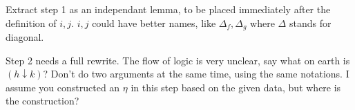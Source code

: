 Extract step 1 as an independant lemma, to be placed immediately after
the definition of $ i, j $.
$ i, j $ could have better names, like $ \Delta _{f}, \Delta _{g} $ where
$ \Delta $ stands for diagonal.

Step 2 needs a full rewrite. The flow of logic is very unclear, say
what on earth is $ (h \downarrow k) $?
Don't do two arguments at the same time, using the same notations.
I assume you constructed an $ \eta $ in this step based on the given data,
but where is the construction?


